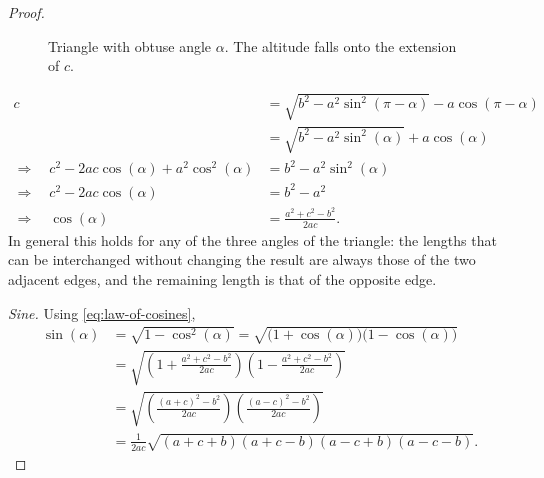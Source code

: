\begin{proof}
\begin{figure}[tbp]
  \centering
  \caption{Triangle with obtuse angle $\alpha$. The altitude falls onto
    the extension of $c$.}
  \label{fig:triangle-obtuse}
\end{figure}
\begin{align*}
  c &= \sqrt{b^2 - a^2\sin^2(\pi-\alpha)} - a\cos(\pi-\alpha) \\
    &= \sqrt{b^2 - a^2\sin^2(\alpha)} + a\cos(\alpha) \\
  \Rightarrow\quad
  c^2 - 2ac\cos(\alpha) + a^2\cos^2(\alpha) &= b^2 - a^2\sin^2(\alpha) \\
  \Rightarrow\quad
  c^2 - 2ac\cos(\alpha) &= b^2 - a^2 \\
  \Rightarrow\quad
  \cos(\alpha) &= \frac{a^2 + c^2 - b^2}{2ac}.
\end{align*}
In general this holds for any of the three angles of the triangle: the
lengths that can be interchanged without changing the result are always
those of the two adjacent edges, and the remaining length is that of the
opposite edge.

\emph{Sine.}
Using \eqref{eq:law-of-cosines},
\begin{align*}
  \sin(\alpha)
  &= \sqrt{1 - \cos^2(\alpha)}
   = \sqrt{\bigl(1 + \cos(\alpha)\bigr)\bigl(1 - \cos(\alpha)\bigr)} \\
  &= \sqrt{\left(1 + \frac{a^2 + c^2 - b^2}{2ac}\right)
           \left(1 - \frac{a^2 + c^2 - b^2}{2ac}\right)} \\
  &= \sqrt{\left(\frac{(a+c)^2 - b^2}{2ac}\right)
           \left(\frac{(a-c)^2 - b^2}{2ac}\right)} \\
  &= \frac{1}{2ac}\sqrt{(a+c+b)(a+c-b)(a-c+b)(a-c-b)}.
\end{align*}
\end{proof}

